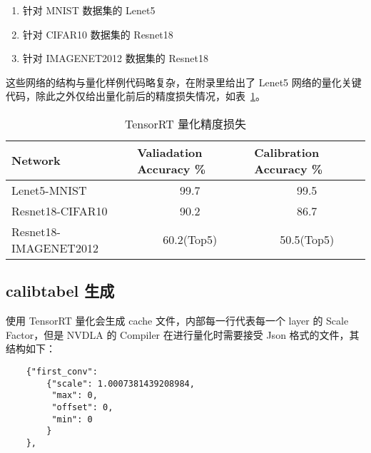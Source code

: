 \begin{enumerate}
    \item 针对 MNIST 数据集的 Lenet5
    \item 针对 CIFAR10 数据集的 Resnet18
    \item 针对 IMAGENET2012 数据集的 Resnet18
\end{enumerate}

这些网络的结构与量化样例代码略复杂，在附录里给出了 Lenet5 网络的量化关键代码，除此之外仅给出量化前后的精度损失情况，如表~\ref{tab:Qualifications Report}。

\begin{table}[!htbp]
    \caption{TensorRT 量化精度损失}
    \label{tab:Qualifications Report}
    \centering
    \footnotesize%
    \setlength{\tabcolsep}{4pt}%
    \renewcommand{\arraystretch}{1.2}%
    \begin{tabular}{lcc}
        \toprule
        \textbf{Network}      & \multicolumn{1}{l}{\textbf{Valiadation Accuracy \%}} & \multicolumn{1}{l}{\textbf{Calibration Accuracy \%}} \\
        \midrule
        Lenet5-MNIST          & 99.7                                                 & 99.5                                                 \\
        Resnet18-CIFAR10      & 90.2                                                 & 86.7                                                 \\
        Resnet18-IMAGENET2012 & 60.2(Top5)                                           & 50.5(Top5)                                           \\
        \bottomrule                   
    \end{tabular}
\end{table}

\subsection{calibtabel 生成}

使用 TensorRT 量化会生成 cache 文件，内部每一行代表每一个 layer 的 Scale Factor，但是 NVDLA 的 Compiler 在进行量化时需要接受 Json 格式的文件，其结构如下：

\begin{lstlisting}
    {"first_conv":
        {"scale": 1.0007381439208984,
         "max": 0,
         "offset": 0,
         "min": 0
        }
    },
\end{lstlisting}

